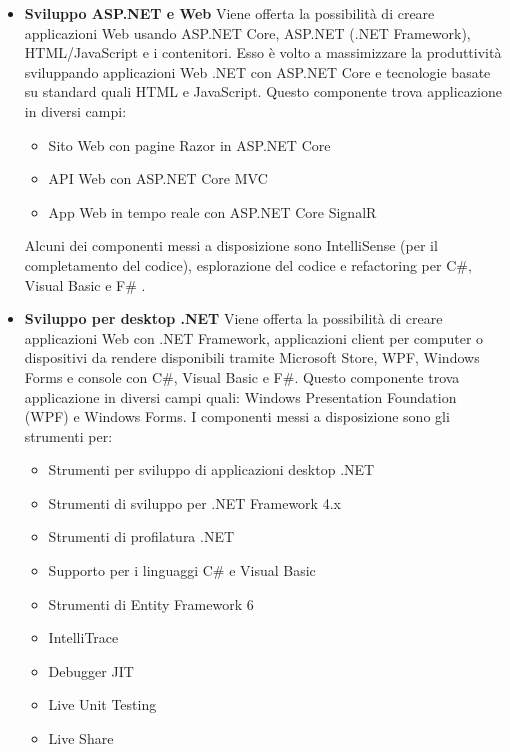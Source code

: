\begin{itemize}
\item
\textbf{Sviluppo ASP.NET e Web}
Viene offerta la possibilità di creare applicazioni Web usando ASP.NET Core, ASP.NET (.NET Framework), HTML/JavaScript e i contenitori. Esso è volto a massimizzare la produttività sviluppando applicazioni Web .NET con ASP.NET Core e tecnologie basate su standard quali HTML e JavaScript.
Questo componente trova applicazione in diversi campi:
\begin{itemize}
\item 
Sito Web con pagine Razor in ASP.NET Core
\item 
API Web con ASP.NET Core MVC
\item 
App Web in tempo reale con ASP.NET Core SignalR
\end{itemize}
Alcuni dei componenti messi a disposizione sono IntelliSense (per il completamento del codice), esplorazione del codice e refactoring per C\#, Visual Basic e F\# \cite{VS}.
\item
\textbf{Sviluppo per desktop .NET}
Viene offerta la possibilità di creare applicazioni Web con .NET Framework, applicazioni client per computer o dispositivi da rendere disponibili tramite Microsoft Store, WPF, Windows Forms e console con C\#, Visual Basic e F\#. Questo componente trova applicazione in diversi campi quali: Windows Presentation Foundation (WPF) e Windows Forms.
I componenti messi a disposizione sono gli strumenti per:
\begin{itemize}
\item
Strumenti per sviluppo di applicazioni desktop .NET
\item
Strumenti di sviluppo per .NET Framework 4.x
\item
Strumenti di profilatura .NET
\item
Supporto per i linguaggi C\# e Visual Basic
\item
Strumenti di Entity Framework 6
\item
IntelliTrace
\item
Debugger JIT
\item
Live Unit Testing
\item
Live Share
\end{itemize}
\end{itemize}

